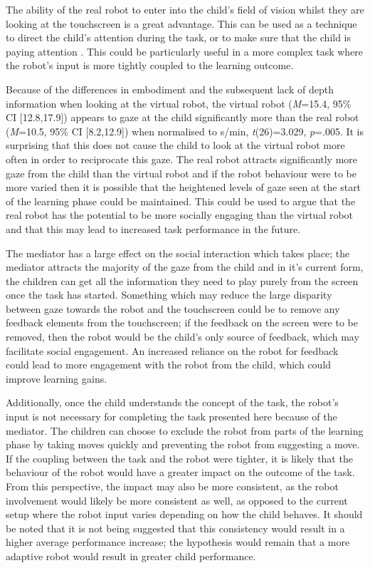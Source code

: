 The ability of the real robot to enter into the child's field of vision whilst they are looking at the touchscreen is a great advantage. This can be used as a technique to direct the child's attention during the task, or to make sure that the child is paying attention \citep{szafir2012pay}. This could be particularly useful in a more complex task where the robot's input is more tightly coupled to the learning outcome.

Because of the differences in embodiment and the subsequent lack of depth information when looking at the virtual robot, the virtual robot (\textit{M}=15.4, 95\% CI [12.8,17.9]) appears to gaze at the child significantly more than the real robot (\textit{M}=10.5, 95\% CI [8.2,12.9]) when normalised to s/min, \textit{t}(26)=3.029, \textit{p}=.005. It is surprising that this does not cause the child to look at the virtual robot more often in order to reciprocate this gaze. The real robot attracts significantly more gaze from the child than the virtual robot and if the robot behaviour were to be more varied then it is possible that the heightened levels of gaze seen at the start of the learning phase could be maintained. This could be used to argue that the real robot has the potential to be more socially engaging than the virtual robot and that this may lead to increased task performance in the future. 

The mediator has a large effect on the social interaction which takes place; the mediator attracts the majority of the gaze from the child and in it's current form, the children can get all the information they need to play purely from the screen once the task has started. Something which may reduce the large disparity between gaze towards the robot and the touchscreen could be to remove any feedback elements from the touchscreen; if the feedback on the screen were to be removed, then the robot would be the child's only source of feedback, which may facilitate social engagement. An increased reliance on the robot for feedback could lead to more engagement with the robot from the child, which could improve learning gains.

Additionally, once the child understands the concept of the task, the robot's input is not necessary for completing the task presented here because of the mediator. The children can choose to exclude the robot from parts of the learning phase by taking moves quickly and preventing the robot from suggesting a move. If the coupling between the task and the robot were tighter, it is likely that the behaviour of the robot would have a greater impact on the outcome of the task. From this perspective, the impact may also be more consistent, as the robot involvement would likely be more consistent as well, as opposed to the current setup where the robot input varies depending on how the child behaves. It should be noted that it is not being suggested that this consistency would result in a higher average performance increase; the hypothesis would remain that a more adaptive robot would result in greater child performance.

